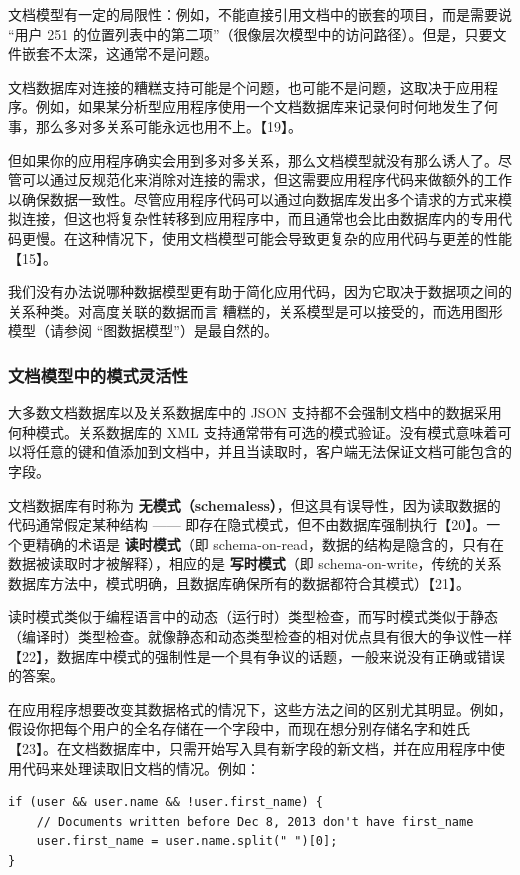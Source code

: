 文档模型有一定的局限性：例如，不能直接引用文档中的嵌套的项目，而是需要说 “用户 251 的位置列表中的第二项”（很像层次模型中的访问路径）。但是，只要文件嵌套不太深，这通常不是问题。

文档数据库对连接的糟糕支持可能是个问题，也可能不是问题，这取决于应用程序。例如，如果某分析型应用程序使用一个文档数据库来记录何时何地发生了何事，那么多对多关系可能永远也用不上。【19】。

但如果你的应用程序确实会用到多对多关系，那么文档模型就没有那么诱人了。尽管可以通过反规范化来消除对连接的需求，但这需要应用程序代码来做额外的工作以确保数据一致性。尽管应用程序代码可以通过向数据库发出多个请求的方式来模拟连接，但这也将复杂性转移到应用程序中，而且通常也会比由数据库内的专用代码更慢。在这种情况下，使用文档模型可能会导致更复杂的应用代码与更差的性能【15】。

我们没有办法说哪种数据模型更有助于简化应用代码，因为它取决于数据项之间的关系种类。对高度关联的数据而言 糟糕的，关系模型是可以接受的，而选用图形模型（请参阅 “图数据模型”）是最自然的。

\subsubsection{文档模型中的模式灵活性}

大多数文档数据库以及关系数据库中的 JSON 支持都不会强制文档中的数据采用何种模式。关系数据库的 XML 支持通常带有可选的模式验证。没有模式意味着可以将任意的键和值添加到文档中，并且当读取时，客户端无法保证文档可能包含的字段。

文档数据库有时称为 \textbf{无模式（schemaless）}，但这具有误导性，因为读取数据的代码通常假定某种结构 —— 即存在隐式模式，但不由数据库强制执行【20】。一个更精确的术语是 \textbf{读时模式}（即 schema-on-read，数据的结构是隐含的，只有在数据被读取时才被解释），相应的是 \textbf{写时模式}（即 schema-on-write，传统的关系数据库方法中，模式明确，且数据库确保所有的数据都符合其模式）【21】。

读时模式类似于编程语言中的动态（运行时）类型检查，而写时模式类似于静态（编译时）类型检查。就像静态和动态类型检查的相对优点具有很大的争议性一样【22】，数据库中模式的强制性是一个具有争议的话题，一般来说没有正确或错误的答案。

在应用程序想要改变其数据格式的情况下，这些方法之间的区别尤其明显。例如，假设你把每个用户的全名存储在一个字段中，而现在想分别存储名字和姓氏【23】。在文档数据库中，只需开始写入具有新字段的新文档，并在应用程序中使用代码来处理读取旧文档的情况。例如：

\begin{lstlisting}
if (user && user.name && !user.first_name) {
    // Documents written before Dec 8, 2013 don't have first_name
    user.first_name = user.name.split(" ")[0];
}
\end{lstlisting}

